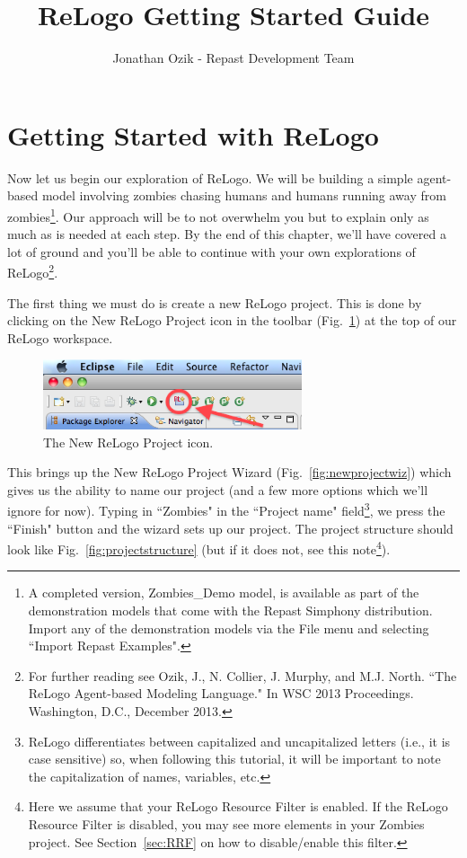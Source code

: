 \documentclass[11pt]{amsart}
\title{ReLogo Getting Started Guide}
\author{Jonathan Ozik - Repast Development Team}
\begin{document}
 
\maketitle
\setcounter{section}{-1}



\section{Getting Started with ReLogo}
Now let us begin our exploration of ReLogo. We will be building a simple agent-based model involving  zombies chasing humans and humans running away from zombies\footnote{ A completed version, Zombies\_Demo model, is available as part of the demonstration models that come with the Repast Simphony distribution. Import any of the demonstration models via the File menu and selecting ``Import Repast Examples".}. Our approach will be to not overwhelm you but to explain only as much as is needed at each step. By the end of this chapter, we'll have covered a lot of ground and you'll be able to continue with your own explorations of ReLogo\footnote{ For further reading see Ozik, J., N. Collier, J. Murphy, and M.J. North. ``The ReLogo Agent-based Modeling Language." In WSC 2013 Proceedings. Washington, D.C., December 2013.}.

The first thing we must do is create a new ReLogo project. This is done by clicking on the New ReLogo Project icon in the toolbar (Fig.~\ref{fig:newprojecticon}) at the top of our ReLogo workspace.

\begin{figure}[h]
\begin{center}
\vspace{.2in}
\centerline {
\includegraphics[width=3in]{GettingStartedImages/NewProject.png}
}
\caption{The New ReLogo Project icon.}
\label{fig:newprojecticon}
\end{center}
\end{figure}

This brings up the New ReLogo Project Wizard (Fig.~\ref{fig:newprojectwiz}) which gives us the ability to name our project (and a few more options which we'll ignore for now). Typing in ``Zombies" in the ``Project name" field\footnote{ReLogo differentiates between capitalized and uncapitalized letters (i.e., it is case sensitive) so, when following this tutorial, it will be important to note the capitalization of names, variables, etc.}, we press the ``Finish" button and the wizard sets up our project. The project structure should look like Fig.~\ref{fig:projectstructure} (but if it does not, see this note\footnote{Here we assume that your ReLogo Resource Filter is enabled. If the ReLogo Resource Filter is disabled, you may see more elements in your Zombies project. See Section~\ref{sec:RRF} on how to disable/enable this filter.}).
\end{document}
